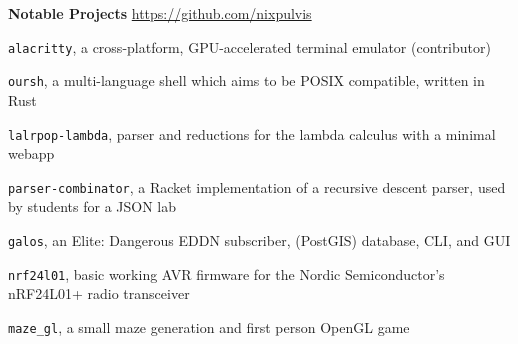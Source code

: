 \item
\headerrow
{\textbf{Notable Projects}}
{\url{https://github.com/nixpulvis}}
\begin{itemize*}
    \item \texttt{alacritty}, a cross-platform, GPU-accelerated terminal emulator (contributor)
    \item \texttt{oursh}, a multi-language shell which aims to be POSIX
    compatible, written in Rust
    \item \texttt{lalrpop-lambda}, parser and reductions for the lambda
    calculus with a minimal webapp
    \item \texttt{parser-combinator}, a Racket implementation of a recursive
    descent parser, used by students for a JSON lab
    \item \texttt{galos}, an Elite: Dangerous EDDN subscriber, (PostGIS)
    database, CLI, and GUI
    \item \texttt{nrf24l01}, basic working AVR firmware for the Nordic
    Semiconductor's nRF24L01+ radio transceiver
    \item \texttt{maze\_gl}, a small maze generation and first person OpenGL game
\end{itemize*}
